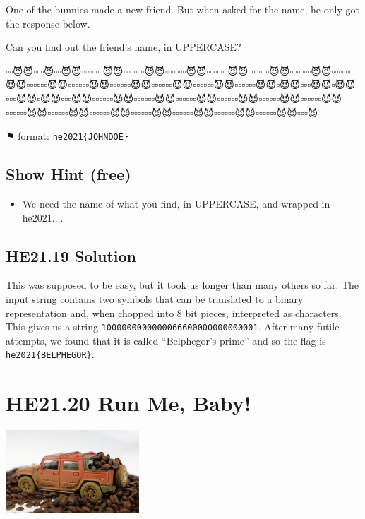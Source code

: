 \documentclass[english,a4paper,nols,noindent]{tufte-handout}
\begin{document}
\noindent One of the bunnies made a new friend. But when asked for the name, he only got the response below.

Can you find out the friend's name, in UPPERCASE?

\begin{verbatim*}
▫️▫️😈😈▫️▫️▫️😈▫️▫️😈😈▫️▫️▫️▫️▫️▫️😈😈▫️▫️▫️▫️▫️▫️😈😈▫️▫️▫️▫️▫️▫️😈😈▫️▫️▫️▫️▫️▫️😈😈▫️▫️▫️▫️▫️▫️😈😈▫️▫️▫️▫️▫️▫️😈😈▫️▫️▫️▫️▫️▫️😈😈▫️▫️▫️▫️▫️▫️😈😈▫️▫️▫️▫️▫️▫️😈😈▫️▫️▫️▫️▫️▫️😈😈▫️▫️▫️▫️▫️▫️😈😈▫️▫️▫️▫️▫️▫️😈😈▫️▫️▫️▫️▫️▫️😈😈▫️😈😈▫️▫️▫️😈😈▫️😈😈▫️▫️▫️😈😈▫️😈😈▫️▫️▫️😈😈▫️▫️▫️▫️▫️▫️😈😈▫️▫️▫️▫️▫️▫️😈😈▫️▫️▫️▫️▫️▫️😈😈▫️▫️▫️▫️▫️▫️😈😈▫️▫️▫️▫️▫️▫️😈😈▫️▫️▫️▫️▫️▫️😈😈▫️▫️▫️▫️▫️▫️😈😈▫️▫️▫️▫️▫️▫️😈😈▫️▫️▫️▫️▫️▫️😈😈▫️▫️▫️▫️▫️▫️😈😈▫️▫️▫️▫️▫️▫️😈😈▫️▫️▫️▫️▫️▫️😈😈▫️▫️▫️▫️▫️▫️😈😈▫️▫️▫️😈
\end{verbatim*}

⚑ format: \verb+he2021{JOHNDOE}+

\subsection{Show Hint (free)}
\begin{itemize}
\item We need the name of what you find, in UPPERCASE, and wrapped in he2021{...}.
\end{itemize}


\hypertarget{he21.19-solution}{%
\subsection{HE21.19 Solution}\label{he21.19-solution}}

\noindent This was supposed to be easy, but it took us longer than
many others so far.  The input string contains two symbols that can be
translated to a binary representation and, when chopped into 8 bit
pieces, interpreted as characters.  This gives us a string
\verb+1000000000000066600000000000001+.  After many futile attempts,
we found that it is called ``Belphegor's prime'' and so the flag is
\verb+he2021{BELPHEGOR}+.

\hypertarget{he21.20}{%
  \section{HE21.20 Run Me, Baby!}
  \label{he21.20}}
\begin{marginfigure}
    \includegraphics[width=50mm]{images/challenge20.jpg}
\end{marginfigure}
\end{document}
